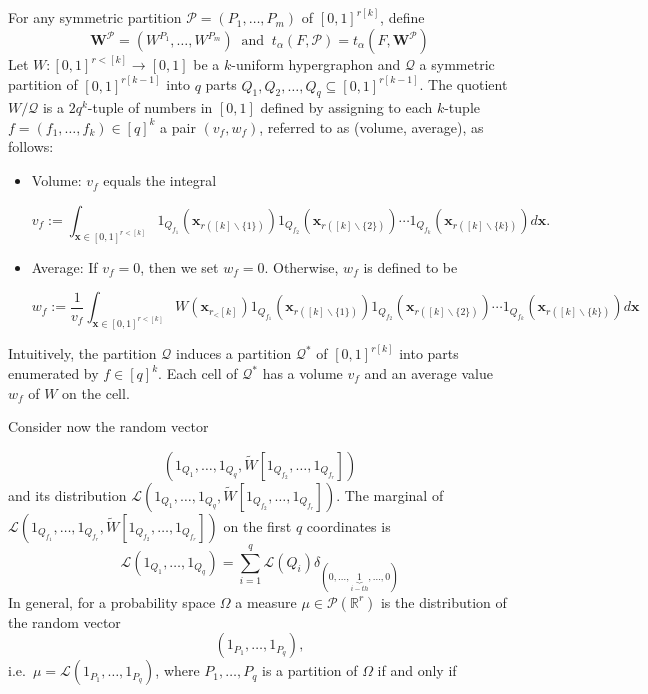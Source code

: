 \documentclass[11pt]{article}
\def\R{\mathbb{R}}
\begin{document}
For any symmetric partition $\mathcal{P}=(P_1,\ldots,P_m)$ of $[0,1]^{r[k]}$, define 
$$
\mathbf{W}^{\mathcal{P}}=(W^{P_1},\ldots,W^{P_m})\ \text{           and          } \ t_{\alpha}(F,\mathcal{P})=t_{\alpha}(F,\mathbf{W}^{\mathcal{P}})
$$ Let $W:[0,1]^{r<[k]} \rightarrow[0,1]$ be a $k$-uniform hypergraphon and $\mathcal{Q}$ a symmetric partition of $[0,1]^{r[k-1]}$ into $q$ parts $Q_1, Q_2, \ldots, Q_q \subseteq[0,1]^{r[k-1]}$. The quotient $W / \mathcal{Q}$ is a $2 q^k$-tuple of numbers in $[0,1]$ defined by assigning to each $k$-tuple $f=\left(f_1, \ldots, f_k\right) \in[q]^k$ a pair $\left(v_f, w_f\right)$, referred to as (volume, average), as follows:
\begin{itemize}
\item Volume: $v_f$ equals the integral

$$
v_f:=\int_{\mathbf{x} \in[0,1]^{r<[k]}} 1_{Q_{f_1}}\left(\mathbf{x}_{r([k] \backslash\{1\})}\right) 1_{Q_{f_2}}\left(\mathbf{x}_{r([k] \backslash\{2\})}\right) \cdots 1_{Q_{f_k}}\left(\mathbf{x}_{r([k] \backslash\{k\})}\right) d \mathbf{x} .
$$

\item Average: If $v_f=0$, then we set $w_f=0$. Otherwise, $w_f$ is defined to be

$$
w_f:=\frac{1}{v_f} \int_{\mathbf{x} \in[0,1]^{r<[k]}} W\left(\mathbf{x}_{r_<[k]}\right) 1_{Q_{f_1}}\left(\mathbf{x}_{r([k] \backslash\{1\})}\right) 1_{Q_{f_2}}\left(\mathbf{x}_{r([k] \backslash\{2\})}\right) \cdots 1_{Q_{f_k}}\left(\mathbf{x}_{r([k] \backslash\{k\})}\right) d \mathbf{x}
$$
\end{itemize}

Intuitively, the partition $\mathcal{Q}$ induces a partition $\mathcal{Q}^*$ of $[0,1]^{r[k]}$ into parts enumerated by $f \in[q]^k$. Each cell of $\mathcal{Q}^*$ has a volume $v_f$ and an average value $w_f$ of $W$ on the cell.

Consider now the random vector

$$( 1_{Q_{1}},\ldots,1_{Q_{q}},\widetilde{W}[1_{Q_{f_2}},\ldots,1_{Q_{f_{r}}}])$$
and its distribution $\mathcal{L}( 1_{Q_{1}},\ldots,1_{Q_{q}},\widetilde{W}[1_{Q_{f_2}},\ldots,1_{Q_{f_{r}}}])$. The marginal of $\mathcal{L}( 1_{Q_{f_1}},\ldots,1_{Q_{f_{r}}},\widetilde{W}[1_{Q_{f_2}},\ldots,1_{Q_{f_{r}}}])$ on the first $q$ coordinates is
$$
\mathcal{L}( 1_{Q_{1}},\ldots,1_{Q_{q}})=\sum^q_{i=1}\mathcal{L}(Q_i)\delta_{(0,\ldots,\underbrace{1}_{i-th},\ldots,0)}
$$
In general, for a probability space $\Omega$  a measure $\mu \in \mathcal{P}(\R^{r})$ is the distribution of the random vector
$$
( 1_{P_{1}},\ldots,1_{P_{q}}), 
$$
i.e.\ $\mu=\mathcal{L}( 1_{P_{1}},\ldots,1_{P_{q}})$, where $P_1,\ldots,P_q$ is a partition of $\Omega$ if and only if 
\end{document}
